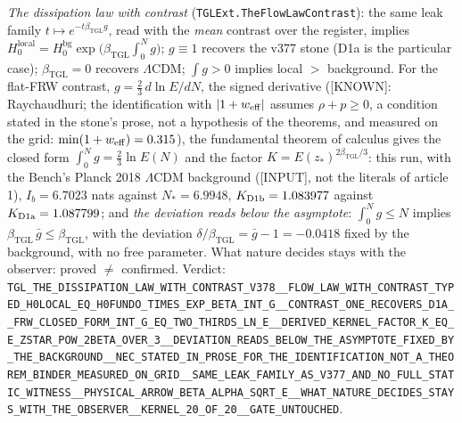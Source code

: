 \documentclass[11pt]{article}
\newcommand{\bTGL}{\beta_{\mathrm{TGL}}}\newcommand{\Msun}{M_{\odot}}\newcommand{\TGL}{\mathrm{TGL}}
\theoremstyle{definition}\newtheorem{deriv}{Derivation}
\begin{document}
\emph{The dissipation law with contrast} (\texttt{TGLExt.TheFlowLawContrast}): the same leak family $t\mapsto e^{-t\bTGL g}$, read with the \emph{mean} contrast over the register, implies $H_0^{\mathrm{local}}=H_0^{\mathrm{bg}}\exp\!\big(\bTGL\int_0^{N}g\big)$; $g\equiv1$ recovers the v377 stone (D1a is the particular case); $\bTGL=0$ recovers $\Lambda$CDM; $\int g>0$ implies local $>$ background. For the flat-FRW contrast, $g=\tfrac23\,d\ln E/dN$, the signed derivative (\textsf{[KNOWN]}: Raychaudhuri; the identification with $|1+w_{\rm eff}|$ assumes $\rho+p\ge0$, a condition stated in the stone's prose, not a hypothesis of the theorems, and measured on the grid: $\min(1+w_{\rm eff})=0.315$), the fundamental theorem of calculus gives the closed form $\int_0^{N}g=\tfrac23\ln E(N)$ and the factor \textbf{$K=E(z_*)^{2\bTGL/3}$}: this run, with the Bench's Planck 2018 $\Lambda$CDM background (\textsf{[INPUT]}, not the literals of article 1), $I_b=6.7023$ nats against $N_*=6.9948$, $K_{\rm D1b}=1.083977$ against $K_{\rm D1a}=1.087799$; and \emph{the deviation reads below the asymptote}: $\int_0^{N}g\le N$ implies $\bTGL\,\bar g\le\bTGL$, with the deviation $\delta/\bTGL=\bar g-1=-0.0418$ fixed by the background, with no free parameter. What nature decides stays with the observer: proved $\neq$ confirmed. Verdict: \texttt{TGL\_THE\_DISSIPATION\_LAW\_WITH\_CONTRAST\_V378\_\_FLOW\_LAW\_WITH\_CONTRAST\_TYPED\_H0LOCAL\_EQ\_H0FUNDO\_TIMES\_EXP\_BETA\_INT\_G\_\_CONTRAST\_ONE\_RECOVERS\_D1A\_\_FRW\_CLOSED\_FORM\_INT\_G\_EQ\_TWO\_THIRDS\_LN\_E\_\_DERIVED\_KERNEL\_FACTOR\_K\_EQ\_E\_ZSTAR\_POW\_2BETA\_OVER\_3\_\_DEVIATION\_READS\_BELOW\_THE\_ASYMPTOTE\_FIXED\_BY\_THE\_BACKGROUND\_\_NEC\_STATED\_IN\_PROSE\_FOR\_THE\_IDENTIFICATION\_NOT\_A\_THEOREM\_BINDER\_MEASURED\_ON\_GRID\_\_SAME\_LEAK\_FAMILY\_AS\_V377\_AND\_NO\_FULL\_STATIC\_WITNESS\_\_PHYSICAL\_ARROW\_BETA\_ALPHA\_SQRT\_E\_\_WHAT\_NATURE\_DECIDES\_STAYS\_WITH\_THE\_OBSERVER\_\_KERNEL\_20\_OF\_20\_\_GATE\_UNTOUCHED}.
\end{document}

